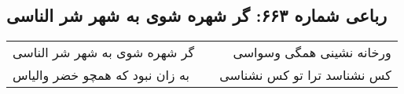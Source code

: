 \begin{center}
\section*{رباعی شماره ۶۶۳: گر شهره شوی به شهر شر الناسی}
\label{sec:sh663}
\begin{longtable}{l p{0.5cm} r}
گر شهره شوی به شهر شر الناسی
&&
ورخانه نشینی همگی وسواسی
\\
به زان نبود که همچو خضر والیاس
&&
کس نشناسد ترا تو کس نشناسی
\\
\end{longtable}
\end{center}
